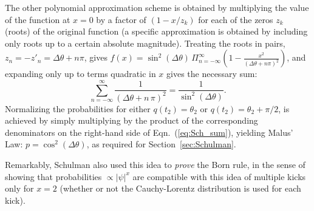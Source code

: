 \documentclass[onecolumn, nofootinbib, 12pt]{revtex4-1}
\newcommand{\eq}[1]{{Eqn.~(\ref{#1})}}
\begin{document}
The other polynomial approximation scheme is obtained by multiplying the value of the function at $x=0$ by a factor of $(1-x/z_k)$ for each of the zeros $z_k$ (roots) of the original function (a specific approximation is obtained by including only roots up to a certain absolute magnitude).  Treating the roots in pairs, $z_n=-z'_n=\Delta\theta+n\pi$, gives 
$f(x) = \sin^2(\Delta\theta) \, 
\Pi_{n=-\infty}^\infty \left( 1 - \frac{x^2}{(\Delta\theta+ n\pi)^2} \right)$, 
and expanding only up to terms quadratic in $x$ gives the necessary sum:
\begin{equation}
\label{eq:Sch_sum}
\sum _{n=-\infty }^{\infty } \frac{1}{( \Delta\theta + n\,\pi )^{2}} = 
\frac{1}{ \sin^{2} \left( \Delta\theta \right) } .
\end{equation}
Normalizing the probabilities for either $q(t_2)=\theta_2$ or $q(t_2)=\theta_2+\pi/2$, is achieved by simply multiplying by the product of the corresponding denominators on the right-hand side of \eq{eq:Sch_sum}, yielding Malus' Law: $p=\cos^2(\Delta\theta)$, as required for Section~\ref{sec:Schulman}.

Remarkably, Schulman also used this idea to \emph{prove} the Born rule, in the sense of showing that probabilities $\propto |\psi|^x$ are compatible with this idea of multiple kicks only for $x=2$ (whether or not the Cauchy-Lorentz distribution is used for each kick).

%

\end{document}

